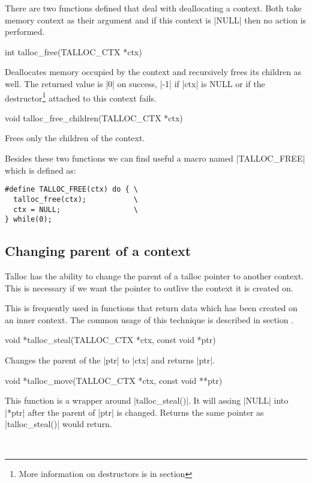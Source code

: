 There are two functions defined that deal with deallocating a context. Both
take memory context as their argument and if this context is |NULL| then no
action is performed.

\begin{funcproto}
int talloc_free(TALLOC_CTX *ctx)
\end{funcproto}
\begin{funcdesc}
  Deallocates memory occupied by the context and recursively frees its 
  children as well. The returned value is |0| on success, |-1| if |ctx| is NULL
  or if the destructor\footnote{More information on destructors is in section
  } attached to this context fails.
\end{funcdesc}
\begin{funcproto}
void talloc_free_children(TALLOC_CTX *ctx)
\end{funcproto}
\begin{funcdesc}
  Frees only the children of the context.
\end{funcdesc}
\funclistend
Besides these two functions we can find useful a macro named |TALLOC_FREE| which
is defined as:

\begin{lstlisting}[caption={TALLOC_FREE(ctx)},label=lst:TALLOC_FREE]
#define TALLOC_FREE(ctx) do { \
  talloc_free(ctx);           \
  ctx = NULL;                 \
} while(0);
\end{lstlisting}



\subsection{Changing parent of a context}
\label{talloc:subsec:stealing}

Talloc has the ability to change the parent of a talloc pointer to another
context. This is necessary if we want the pointer to outlive the context it is
created on.

This is frequently used in functions that return data which has been created on
an inner context. The common usage of this technique is described in section
.

\begin{funcproto}
void *talloc_steal(TALLOC_CTX *ctx, const void *ptr)
\end{funcproto}
\begin{funcdesc}
  Changes the parent of the |ptr| to |ctx| and returns |ptr|.
\end{funcdesc}
\begin{funcproto}
void *talloc_move(TALLOC_CTX *ctx, const void **ptr)
\end{funcproto}
\begin{funcdesc}
  This function is a wrapper around |talloc_steal()|. It will assing |NULL| into
  |*ptr| after the parent of |ptr| is changed. Returns the same pointer as
  |talloc_steal()| would return.
\end{funcdesc}
\
